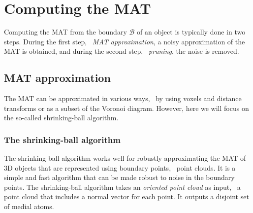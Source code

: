 
\section{Computing the MAT} 
Computing the MAT from the boundary $\mathcal{B}$ of an object is typically done in two steps. 
During the first step, \ie\ \emph{MAT approximation}, a noisy approximation of the MAT is obtained, and during the second step, \ie\ \emph{pruning}, the noise is removed.

\subsection{MAT approximation}
The MAT can be approximated in various ways, \eg\ by using voxels and distance transforms or as a subset of the Voronoi diagram.
However, here we will focus on the so-called shrinking-ball algorithm.

\subsubsection{The shrinking-ball algorithm}
The shrinking-ball algorithm works well for robustly approximating the MAT of 3D objects that are represented using boundary points, \ie\ point clouds.
It is a simple and fast algorithm that can be made robust to noise in the boundary points.
The shrinking-ball algorithm takes an \emph{oriented point cloud} as input, \ie\ a point cloud that includes a normal vector for each point. 
It outputs a disjoint set of medial atoms. 

